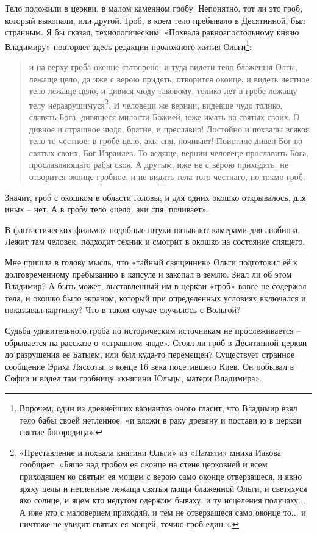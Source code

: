 Тело положили в церкви, в малом каменном гробу. Непонятно, тот ли это гроб, который выкопали, или другой. Гроб, в коем тело пребывало в Десятинной, был странным. Я бы сказал, технологическим. «Похвала равноапостольному князю Владимиру» повторяет здесь редакции проложного жития Ольги\footnote{Впрочем, один из древнейших вариантов оного гласит, что Владимир взял тело бабы своей нетленное: «и вложи в раку древяну и постави ю в церкви святые богородица».}:

\begin{quotation}
и на верху гроба оконце сътворено, и туда видети тело блаженыя Олгы, лежаще цело, да иже с верою придеть, отворится оконце, и видеть честное тело лежаще цело, и дивися чюду таковому, толико лет в гробе лежащу телу неразрушимуся\footnote{«Преставление и похвала княгини Ольги» из «Памяти» мниха Иакова сообщает: «Бяше над гробом ея оконце на стене церковней и всем приходящем ко святым ея мощем с верою само оконце отверзашеся, и явно зряху целы и нетленные лежаща святыя мощи блаженной Ольги, и светяхуся яко солнце, и яцем кто недугом одержим бываху, и ту исцеления получаху... А иже кто с маловерием приходяй, и тем не отверзашеся само оконце то... и ничтоже не увидит святых ея мощей, точию гроб един.».}. И человеци же вернии, видевше чудо толико, славять Бога, дивящеся милости Божией, юже имать на святых своих. О дивное и страшное чюдо, братие, и преславно! Достойно и похвалы всякоя тело то честное: в гробе цело, акы спя, почивает! Поистине дивен Бог во святых своих, Бог Израилев. То ведяще, вернии человеце прославить Бога, прославляющаго рабы своя. А другым, иже не с верою приходять, не отворится оконце гробное, и не видять тела того честнаго, но токмо гроб.
\end{quotation}

Значит, гроб с окошком в области головы, и для одних окошко открывалось, для иных – нет. А в гробу тело «цело, аки спя, почивает».

В фантастических фильмах подобные штуки называют камерами для анабиоза. Лежит там человек, подходит техник и смотрит в окошко на состояние спящего.

Мне пришла в голову мысль, что «тайный священник» Ольги подготовил её к долговременному пребыванию в капсуле и закопал в землю. Знал ли об этом Владимир? А быть может, выставленный им в церкви «гроб» вовсе не содержал тела, и окошко было экраном, который при определенных условиях включался и показывал картинку? Что в таком случае случилось с Вольгой?

Судьба удивительного гроба по историческим источникам не прослеживается – обрывается на рассказе о «страшном чюде». Стоял ли гроб в Десятинной церкви до разрушения ее Батыем, или был куда-то перемещен? Существует странное сообщение Эриха Ляссоты, в конце 16 века посетившего Киев. Он побывал в Софии и видел там гробницу «княгини Юльцы, матери Владимира».

